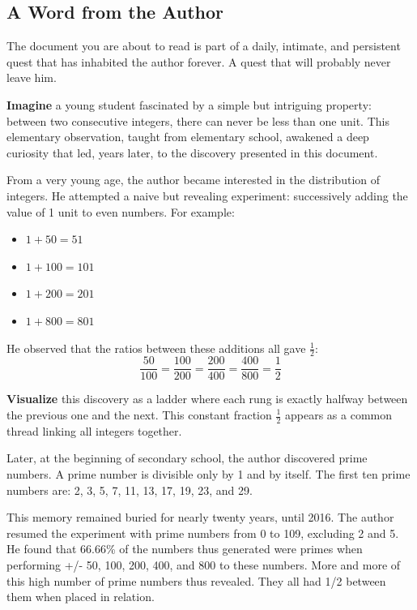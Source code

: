 \documentclass[a4paper,11pt]{article}
\newenvironment{resume}{%
    \begin{tcolorbox}[colback=purple!5,colframe=holpurple,title={\textbf{Visual Summary}}]
}{%
    \end{tcolorbox}
}
\begin{document}
\subsection{A Word from the Author}

The document you are about to read is part of a daily, intimate, and persistent quest that has inhabited the author forever. A quest that will probably never leave him.

\begin{resume}
\textbf{Imagine} a young student fascinated by a simple but intriguing property: between two consecutive integers, there can never be less than one unit. This elementary observation, taught from elementary school, awakened a deep curiosity that led, years later, to the discovery presented in this document.
\end{resume}

From a very young age, the author became interested in the distribution of integers. He attempted a naive but revealing experiment: successively adding the value of 1 unit to even numbers. For example:
\begin{itemize}
    \item $1 + 50 = 51$
    \item $1 + 100 = 101$
    \item $1 + 200 = 201$
    \item $1 + 800 = 801$
\end{itemize}

He observed that the ratios between these additions all gave $\frac{1}{2}$:
\[
\frac{50}{100} = \frac{100}{200} = \frac{200}{400} = \frac{400}{800} = \frac{1}{2}
\]

\begin{resume}
\textbf{Visualize} this discovery as a ladder where each rung is exactly halfway between the previous one and the next. This constant fraction $\frac{1}{2}$ appears as a common thread linking all integers together.
\end{resume}

Later, at the beginning of secondary school, the author discovered prime numbers. A prime number is divisible only by 1 and by itself. The first ten prime numbers are: 2, 3, 5, 7, 11, 13, 17, 19, 23, and 29.

This memory remained buried for nearly twenty years, until 2016. The author resumed the experiment with prime numbers from 0 to 109, excluding 2 and 5. He found that 66.66\% of the numbers thus generated were primes when performing +/- 50, 100, 200, 400, and 800 to these numbers. More and more of this high number of prime numbers thus revealed. They all had 1/2 between them when placed in relation.
\end{document}
